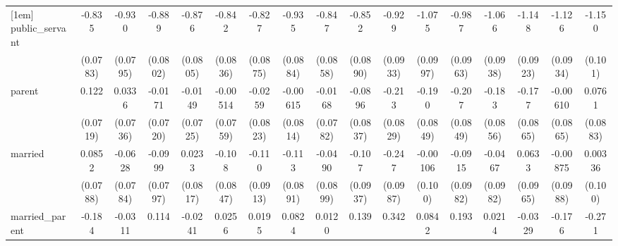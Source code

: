 {\begin{tabular}{l*{16}{c}}
[1em]
public\_servant      &      -0.835\sym{***}&      -0.930\sym{***}&      -0.889\sym{***}&      -0.876\sym{***}&      -0.842\sym{***}&      -0.827\sym{***}&      -0.935\sym{***}&      -0.847\sym{***}&      -0.852\sym{***}&      -0.929\sym{***}&      -1.075\sym{***}&      -0.987\sym{***}&      -1.066\sym{***}&      -1.148\sym{***}&      -1.126\sym{***}&      -1.150\sym{***}\\
                    &    (0.0783)         &    (0.0795)         &    (0.0802)         &    (0.0805)         &    (0.0836)         &    (0.0875)         &    (0.0884)         &    (0.0858)         &    (0.0890)         &    (0.0933)         &    (0.0997)         &    (0.0963)         &    (0.0938)         &    (0.0923)         &    (0.0934)         &     (0.101)         \\
[1em]
parent              &       0.122         &      0.0336         &     -0.0171         &     -0.0149         &    -0.00514         &     -0.0259         &    -0.00615         &     -0.0168         &     -0.0896         &      -0.213\sym{*}  &      -0.190\sym{*}  &      -0.207\sym{*}  &      -0.183\sym{*}  &      -0.177\sym{*}  &    -0.00610         &      0.0761         \\
                    &    (0.0719)         &    (0.0736)         &    (0.0720)         &    (0.0725)         &    (0.0759)         &    (0.0823)         &    (0.0814)         &    (0.0782)         &    (0.0837)         &    (0.0829)         &    (0.0849)         &    (0.0849)         &    (0.0856)         &    (0.0865)         &    (0.0865)         &    (0.0883)         \\
[1em]
married             &      0.0852         &     -0.0628         &     -0.0999         &      0.0233         &      -0.108         &      -0.110         &      -0.113         &     -0.0490         &      -0.107         &      -0.247\sym{*}  &    -0.00106         &     -0.0915         &     -0.0467         &      0.0633         &    -0.00875         &     0.00336         \\
                    &    (0.0788)         &    (0.0784)         &    (0.0797)         &    (0.0817)         &    (0.0847)         &    (0.0913)         &    (0.0891)         &    (0.0899)         &    (0.0937)         &    (0.0987)         &     (0.100)         &    (0.0982)         &    (0.0982)         &    (0.0965)         &    (0.0988)         &     (0.100)         \\
[1em]
married\_parent      &      -0.184         &     -0.0311         &       0.114         &     -0.0241         &      0.0256         &      0.0195         &      0.0824         &      0.0120         &       0.139         &       0.342\sym{**} &      0.0842         &       0.193         &      0.0214         &     -0.0329         &      -0.176         &      -0.271\sym{*}  \\

\end{tabular}}
